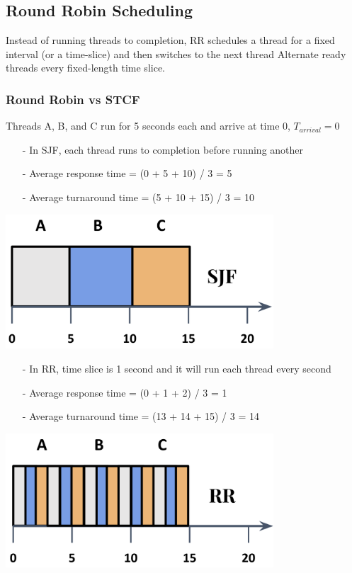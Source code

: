 \documentclass[../../compsys.tex]{subfiles}
\begin{document}
\subsection{Round Robin Scheduling}
Instead of running threads to completion, RR schedules a thread for a fixed interval (or a time-slice) and then switches to the next thread
Alternate ready threads every fixed-length time slice. 
\subsubsection{Round Robin vs STCF}
Threads A, B, and C run for 5 seconds each and arrive at time 0, $T_{arrival} = 0$\\[5px]

\begin{minipage}[htp]{0.5\textwidth}
    \begin{itemize}
        \item[-] In SJF, each thread runs to completion before running another
        \item[-] Average response time = (0 + 5 + 10) / 3 = 5
        \item[-] Average turnaround time = (5 + 10 + 15)  / 3 = 10
    \end{itemize}
    \begin{center}
        \includegraphics[width=0.75\textwidth]{images/vs_sjf.png}
    \end{center}
\end{minipage}
\hfill
\begin{minipage}[htp]{0.5\textwidth}
    \begin{itemize}
        \item[-] In RR, time slice is 1 second and it will run each thread every second
        \item[-] Average response time = (0 + 1 + 2) / 3 = 1
        \item[-] Average turnaround time = (13 + 14 + 15) / 3 = 14
    \end{itemize}
    \begin{center}
        \includegraphics[width=0.75\textwidth]{images/vs_rr.png}
    \end{center}
\end{minipage}\\
\end{document}
